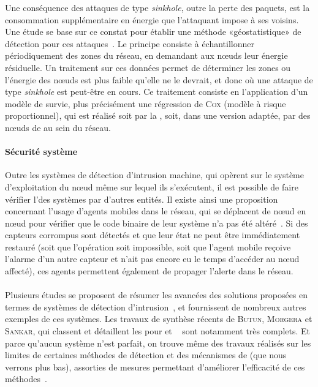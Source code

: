 Une conséquence des attaques de type \textit{sinkhole}, outre la perte des paquets, est la consommation supplémentaire en énergie que l'attaquant impose à ses voisins.
Une étude se base sur ce constat pour établir une méthode «géostatistique» de détection pour ces attaques~\cite{SKDM14}.
Le principe consiste à échantillonner périodiquement des zones du réseau, en demandant aux nœuds leur énergie résiduelle.
Un traitement sur ces données permet de déterminer les zones ou l'énergie des nœuds est plus faible qu'elle ne le devrait, et donc où une attaque de type \textit{sinkhole} est peut-être en cours.
Ce traitement consiste en l'application d'un modèle de survie, plus précisément une régression de \textsc{Cox} (modèle à risque proportionnel), qui est réalisé soit par la \sdb, soit, dans une version adaptée, par des nœuds de  au sein du réseau.

        \paragraph{Sécurité système}
Outre les systèmes de détection d'intrusion machine, qui opèrent sur le système d'exploitation du nœud même sur lequel ils s'exécutent, il est possible de faire vérifier l'\integrite des systèmes par d'autres entités.
Il existe ainsi une proposition concernant l'usage d'agents mobiles dans le réseau, qui se déplacent de nœud en nœud pour vérifier que le code binaire de leur système n'a pas été altéré~\cite{HR13}.
Si des capteurs corrompus sont détectés et que leur état ne peut être immédiatement restauré (soit que l'opération soit impossible, soit que l'agent mobile reçoive l'alarme d'un autre capteur et n'ait pas encore eu le temps d'accéder au nœud affecté), ces agents permettent également de propager l'alerte dans le réseau.

        \paragraph{}
Plusieurs études se proposent de résumer les avancées des solutions proposées en termes de systèmes de détection d'intrusion~\cite{ME13,MS14}, et fournissent de nombreux autres exemples de ces systèmes.
Les travaux de synthèse récents de \textsc{Butun, Morgera} et \textsc{Sankar}, qui classent et détaillent les \IDS pour \manet et \rcsfs~\cite{BMS13} sont notamment très complets.
Et parce qu'aucun système \IDS n'est parfait, on trouve même des travaux réalisés sur les limites de certaines méthodes de détection et des mécanismes de  (que nous verrons plus bas), assorties de mesures permettant d'améliorer l'efficacité de ces méthodes~\cite{CQW12}.
